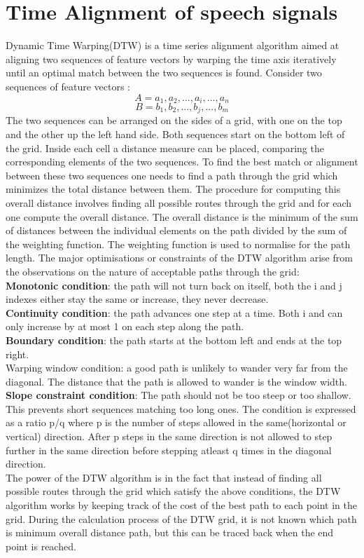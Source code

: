 \documentclass[BTech]{nitkdiss}
\begin{document}
\section{Time Alignment of speech signals}
Dynamic Time Warping(DTW) is a time series alignment algorithm aimed at aligning two sequences of feature vectors by warping the time axis iteratively until an optimal match between the two sequences is found. Consider two sequences of feature vectors : $$A = a_{1},a_{2},...,a_{i},...,a_{n}$$ $$ B = b_{1},b_{2},...,b_{j},...,b_{m}$$ The two sequences can be arranged on the sides of a grid, with one on the top and the other up the left hand side. Both sequences start on the bottom left of the grid. Inside each cell a distance measure can be placed, comparing the corresponding elements of the two sequences. To find the best match or alignment between these two sequences one needs to find a path through the grid which minimizes the total distance between them. The procedure for computing this overall distance involves finding all possible routes through the grid and for each one compute the overall distance. The overall distance is the minimum of the sum of distances between the individual elements on the path divided by the sum of the weighting function. The weighting function is used to normalise for the path length. The major optimisations or constraints of the DTW algorithm arise from the observations on the nature of acceptable paths through the grid:\\
\textbf{Monotonic condition}: the path will not turn back on itself, both the i and j indexes either stay the same or increase, they never decrease.\\
\textbf{Continuity condition}: the path advances one step at a time. Both i and  can only increase by at most 1 on each step along the path. \\
\textbf{Boundary condition}: the path starts at the bottom left and ends at the top right.\\
Warping window condition: a good path is unlikely to wander very far from the diagonal. The distance that the path is allowed to wander is the window width. \\
\textbf{Slope constraint condition}: The path should not be too steep or too shallow. This prevents short sequences matching too long ones. The condition is expressed as a ratio p/q where p is the number of steps allowed in the same(horizontal or vertical) direction. After p steps in the same direction is not allowed to step further in the same direction before stepping atleast q times in the diagonal direction.\\
The power of the DTW algorithm is in the fact that instead of finding all possible routes through the grid which satisfy the above conditions, the DTW algorithm works by keeping track of the cost of the best path to each point in the grid. During the calculation process of the DTW grid, it is not known which path is minimum overall distance path, but this can be traced back when the end point is reached.
\end{document}
